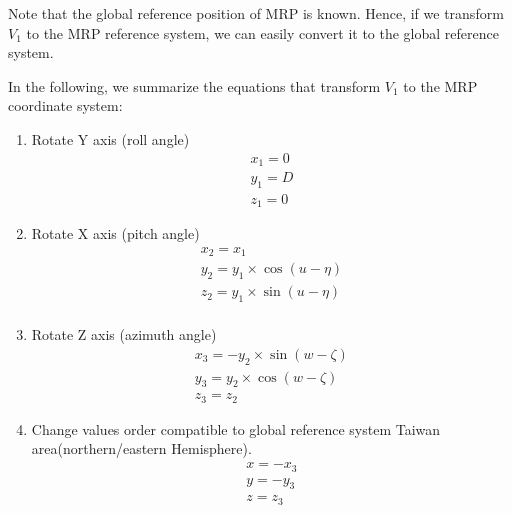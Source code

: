 Note that the global reference position of MRP is known. Hence, if we transform \emph{$V_1$} to the MRP reference system, we can easily convert it to the global reference system.

In the following, we summarize the equations that transform \emph{$V_1$} to the MRP coordinate system:
\begin{enumerate}
  \item Rotate Y axis (roll angle)
\[\begin{array}{l}
x_1 = 0\\
y_1 = D\\
z_1 = 0
\end{array}\]
  \item Rotate X axis (pitch angle)
\[\begin{array}{l}
x_2 = x_1\\
y_2 = y_1 \times \cos (u-\eta)\\
z_2 = y_1 \times \sin (u-\eta)\\
\end{array}\]
  \item Rotate Z axis (azimuth angle)
\[\begin{array}{l}
x_3 =  - y_2 \times \sin (w-\zeta)\\
y_3 = y_2 \times \cos (w-\zeta)\\
z_3 = z_2
\end{array}\]
  \item Change values order compatible to global reference system Taiwan area(northern/eastern Hemisphere).
\[\begin{array}{l}
x =  - x_3\\
y =  - y_3\\
z = z_3
\end{array}\]
\end{enumerate}

